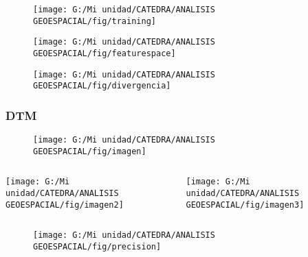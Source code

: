 \documentclass[14pt]{beamer}
\begin{document}
\begin{frame}
  \begin{figure}
    \centering
    \texttt{[image: G:/Mi unidad/CATEDRA/ANALISIS GEOESPACIAL/fig/training]}
  \end{figure}
\tiny{}
\end{frame}
\begin{frame}
  \begin{figure}
    \centering
    \texttt{[image: G:/Mi unidad/CATEDRA/ANALISIS GEOESPACIAL/fig/featurespace]}
  \end{figure}
\tiny{}
\end{frame}
\begin{frame}
  \begin{figure}
    \centering
    \texttt{[image: G:/Mi unidad/CATEDRA/ANALISIS GEOESPACIAL/fig/divergencia]}
  \end{figure}
\tiny{}
\end{frame}
\begin{frame}
\frametitle{DTM}
  \begin{figure}
    \centering
    \texttt{[image: G:/Mi unidad/CATEDRA/ANALISIS GEOESPACIAL/fig/imagen]}
   \end{figure}
\begin{columns}
		\begin{column}{.49\linewidth}
		 \texttt{[image: G:/Mi unidad/CATEDRA/ANALISIS GEOESPACIAL/fig/imagen2]}
		\end{column}
		\begin{column}{.49\linewidth}
			 \texttt{[image: G:/Mi unidad/CATEDRA/ANALISIS GEOESPACIAL/fig/imagen3]}
		\end{column}
	\end{columns}
\end{frame}
\begin{frame}
  \begin{figure}
    \centering
    \texttt{[image: G:/Mi unidad/CATEDRA/ANALISIS GEOESPACIAL/fig/precision]}
  \end{figure}
\tiny{}
\end{frame}
\end{document}
